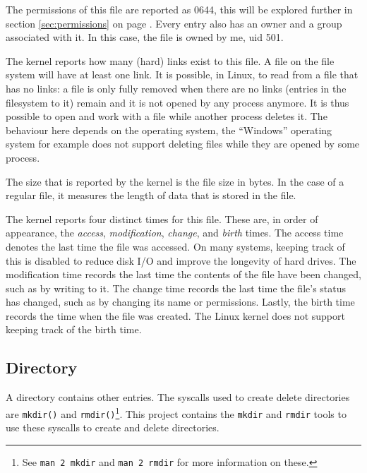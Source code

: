 \documentclass[a4paper]{article}
\begin{document}

The permissions of this file are reported as 0644, this will be explored further in section \ref{sec:permissions} on page \pageref{sec:permissions}. Every entry also has an owner and a group associated with it. In this case, the file is owned by me, \gls{uid} 501.

The kernel reports how many (hard) links exist to this file. A file on the file system will have at least one link. It is possible, in Linux, to read from a file that has no links: a file is only fully removed when there are no links (entries in the filesystem to it) remain and it is not opened by any process anymore. It is thus possible to open and work with a file while another process deletes it. The behaviour here depends on the operating system, the “Windows” operating system for example does not support deleting files while they are opened by some process.

The size that is reported by the kernel is the file size in bytes. In the case of a regular file, it measures the length of data that is stored in the file.

The kernel reports four distinct times for this file. These are, in order of appearance, the \emph{access}, \emph{modification}, \emph{change}, and \emph{birth} times. The access time denotes the last time the file was accessed. On many systems, keeping track of this is disabled to reduce disk I/O and improve the longevity of hard drives. The modification time records the last time the contents of the file have been changed, such as by writing to it. The change time records the last time the file's status has changed, such as by changing its name or permissions. Lastly, the birth time records the time when the file was created. The Linux kernel does not support keeping track of the birth time.



\subsection{Directory}

A directory contains other entries. The syscalls used to create delete directories are \verb|mkdir()| and \verb|rmdir()|\footnote{See \texttt{man 2 mkdir} and \texttt{man 2 rmdir} for more information on these.}. This project contains the \verb|mkdir| and \verb|rmdir| tools to use these syscalls to create and delete directories.
\end{document}
